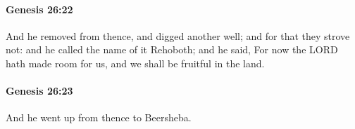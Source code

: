 		\paragraph{Genesis 26:22} %
			\label{GENESIS-26-22}

			And he removed from thence, and digged another well; and for that they strove not: and he called the name of it Rehoboth; and he said, For now the LORD hath made room for us, and we shall be fruitful in the land.


		\paragraph{Genesis 26:23} %
			\label{GENESIS-26-23}

			And he went up from thence to Beersheba.


